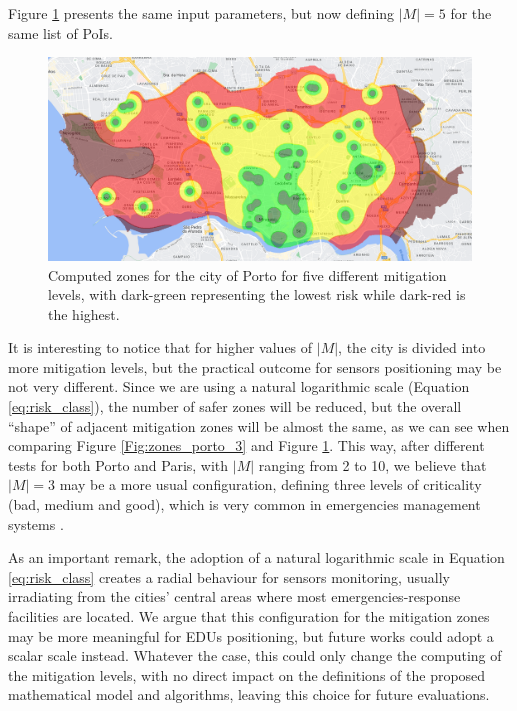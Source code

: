 \begin{refsection}
Figure \ref{Fig:zones_porto_5} presents the same input parameters, but now defining $|M|=5$ for the same list of PoIs.

\begin{figure}[ht!]
    \centering
    \includegraphics[width=0.9\linewidth]{Chapters/2-EDUs/images/porto_M5_no_weight.png}
    \caption{Computed zones for the city of Porto for five different mitigation levels, with dark-green representing the lowest risk while dark-red is the highest.}
    \label{Fig:zones_porto_5}
\end{figure}

It is interesting to notice that for higher values of $|M|$, the city is divided into more mitigation levels, but the practical outcome for sensors positioning may be not very different. Since we are using a natural logarithmic scale (Equation \ref{eq:risk_class}), the number of safer zones will be reduced, but the overall ``shape'' of adjacent mitigation zones will be almost the same, as we can see when comparing Figure \ref{Fig:zones_porto_3} and Figure \ref{Fig:zones_porto_5}. This way, after different tests for both Porto and Paris, with $|M|$ ranging from 2 to 10, we believe that $|M|=3$ may be a more usual configuration, defining three levels of criticality (bad, medium and good), which is very common in emergencies management systems \cite{surveyEmergencies}.

As an important remark, the adoption of a natural logarithmic scale in Equation \ref{eq:risk_class} creates a radial behaviour for sensors monitoring, usually irradiating from the cities' central areas where most emergencies-response facilities are located. We argue that this configuration for the mitigation zones may be more meaningful for EDUs positioning, but future works could adopt a scalar scale instead. Whatever the case, this could only change the computing of the mitigation levels, with no direct impact on the definitions of the proposed mathematical model and algorithms, leaving this choice for future evaluations.


\end{refsection}

